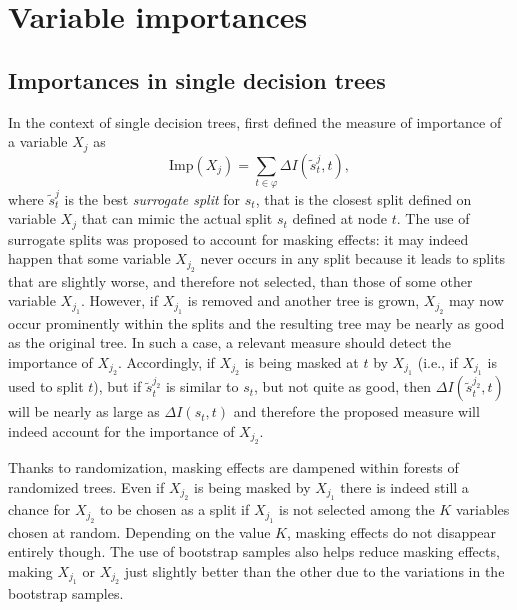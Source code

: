 

\section{Variable importances}
\label{sec:6:importances}

\subsection{Importances in single decision trees}

In the context of single decision trees, \cite{breiman:1984} first defined
the measure of importance of a variable $X_j$ as
\begin{equation}
\text{Imp}(X_j) = \sum_{t\in \varphi} \Delta I(\tilde{s}^j_t, t),
\end{equation}
where $\tilde{s}^j_t$ is the best \textit{surrogate split}
for $s_t$, that is the closest split defined on variable $X_j$ that can mimic the actual
split $s_t$ defined at node $t$. The use of surrogate splits was proposed to
account for masking effects: it may indeed happen that some variable $X_{j_2}$
never occurs in any split because it leads to splits that are slightly worse,
and therefore not selected, than those of some other variable $X_{j_1}$.
However, if $X_{j_1}$ is removed and another tree is grown, $X_{j_2}$ may now
occur prominently within the splits and the resulting tree may be nearly as good
as the original tree. In such a case, a relevant measure should detect the
importance of $X_{j_2}$. Accordingly, if $X_{j_2}$ is being masked at $t$ by
$X_{j_1}$ (i.e., if $X_{j_1}$ is used to split $t$), but if $\tilde{s}^{j_2}_t$ is similar to
$s_t$, but not quite as good, then $\Delta I(\tilde{s}^{j_2}_t, t)$ will be
nearly as large as $\Delta I(s_t, t)$ and therefore the proposed measure will
indeed account for the importance of $X_{j_2}$.

Thanks to randomization, masking effects are dampened within forests of
randomized trees. Even if $X_{j_2}$ is being masked by $X_{j_1}$ there is indeed
still a chance for $X_{j_2}$ to be chosen as a split if $X_{j_1}$ is not
selected among the $K$ variables chosen at random. Depending on the value $K$,
masking effects do not disappear entirely though. The use of bootstrap samples
also helps reduce masking effects, making $X_{j_1}$ or $X_{j_2}$ just slightly
better than the other due to the variations in the bootstrap samples.


